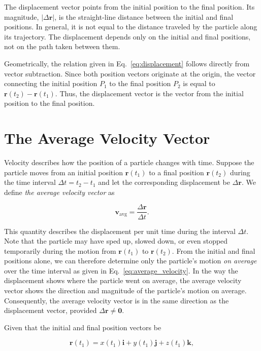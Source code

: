 \documentclass[12pt]{article}
\theoremstyle{remark}
\begin{document}
The displacement vector points from the initial position to the final position. Its magnitude, $\lvert\Delta\mathbf{r}\rvert$, is the straight-line distance between the initial and final positions. In general, it is not equal to the distance traveled by the particle along its trajectory. The displacement depends only on the initial and final positions, not on the path taken between them.

Geometrically, the relation given in Eq.~\eqref{eq:displacement} follows directly from vector subtraction. Since both position vectors originate at the origin, the vector connecting the initial position $P_1$ to the final position $P_2$ is equal to $\mathbf{r}(t_2)-\mathbf{r}(t_1)$. Thus, the displacement vector is the vector from the initial position to the final position.

\section{\label{sec:average_velocity}The Average Velocity Vector}


Velocity describes how the position of a particle changes with time. Suppose the particle moves from an initial position $\mathbf{r}(t_1)$ to a final position $\mathbf{r}(t_2)$ during the time interval $\Delta t = t_2-t_1$ and let the corresponding displacement be $\Delta\mathbf{r}$. We define \emph{the average velocity vector} as

\begin{equation}
\mathbf{v}_{\mathrm{avg}} = \frac{\Delta\mathbf{r}}{\Delta t}.
\label{eq:average_velocity}
\end{equation}

This quantity describes the displacement per unit time during the interval $\Delta t$. Note that the particle may have sped up, slowed down, or even stopped temporarily during the motion from $\mathbf{r}(t_1)$ to $\mathbf{r}(t_2)$. From the initial and final positions alone, we can therefore determine only the particle's motion \emph{on average} over the time interval as given in Eq.~\eqref{eq:average_velocity}. In the way the displacement shows where the particle went on average, the average velocity vector shows the direction and magnitude of the particle's motion on average. Consequently, the average velocity vector is in the same direction as the displacement vector, provided $\Delta\mathbf{r} \neq \mathbf{0}$.

Given that the initial and final position vectors be

\begin{equation}
\mathbf{r}(t_1)
=
x(t_1)\mathbf{i}
+
y(t_1)\mathbf{j}
+
z(t_1)\mathbf{k},
\end{equation}
\end{document}
